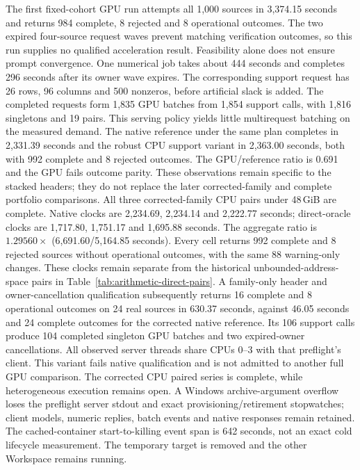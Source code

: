 \documentclass[10pt,twocolumn]{article}
\begin{document}
The first fixed-cohort GPU run attempts all 1,000 sources in 3,374.15 seconds
and returns 984 complete, 8 rejected and 8 operational outcomes.
The two expired four-source request waves prevent matching verification
outcomes, so this run supplies no qualified acceleration result.
Feasibility alone does not ensure prompt convergence. One numerical job
takes about 444 seconds and completes 296 seconds after its owner wave expires.
The corresponding support request has 26 rows, 96 columns and 500 nonzeros,
before artificial slack is added.
The completed requests form 1,835 GPU batches from 1,854 support calls,
with 1,816 singletons and 19 pairs.
This serving policy yields little multirequest batching on the measured demand.
The native reference under the same plan completes in 2,331.39 seconds and the robust
CPU support variant in 2,363.00 seconds, both with 992 complete and 8 rejected
outcomes. The GPU/reference ratio is 0.691 and the GPU fails outcome parity.
These observations remain specific to the stacked headers; they do not replace
the later corrected-family and complete portfolio comparisons.
All three corrected-family CPU pairs under 48\,GiB are complete.
Native clocks are 2,234.69, 2,234.14 and 2,222.77 seconds; direct-oracle
clocks are 1,717.80, 1,751.17 and 1,695.88 seconds.
The aggregate ratio is $1.29560\times$ (6,691.60/5,164.85 seconds).
Every cell returns 992 complete and 8 rejected sources without operational
outcomes, with the same 88 warning-only changes. These clocks remain separate
from the historical unbounded-address-space pairs in
Table~\ref{tab:arithmetic-direct-pairs}.
A family-only header and owner-cancellation qualification subsequently
returns 16 complete and 8 operational outcomes on 24 real sources in
630.37 seconds, against 46.05 seconds and 24 complete outcomes for the
corrected native reference. Its 106 support calls produce 104 completed
singleton GPU batches and two expired-owner cancellations.
All observed server threads share CPUs 0--3 with that preflight's client.
This variant fails native qualification and is not admitted to another
full GPU comparison. The corrected CPU paired series is complete, while heterogeneous execution remains open.
A Windows archive-argument overflow loses the preflight server stdout and
exact provisioning/retirement stopwatches; client models, numeric replies,
batch events and native responses remain retained. The cached-container
start-to-killing event span is 642 seconds, not an exact cold lifecycle
measurement. The temporary target is removed and the other Workspace remains
running.
\end{document}
